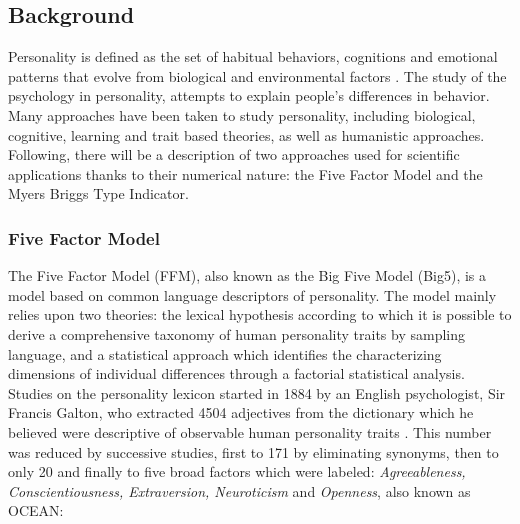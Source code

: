 \documentclass[b5paper,10pt,twoside,cucitura]{toptesi}
\begin{document}
\subsection{Background}

Personality is defined as the set of habitual behaviors, cognitions and emotional patterns that evolve from biological and environmental factors   \citep{gerald}. The study of the psychology in personality, attempts to explain people's differences in behavior. Many approaches have been taken to study personality, including biological, cognitive, learning and trait based theories, as well as humanistic approaches. Following, there will be a description of two approaches used for scientific applications thanks to their numerical nature: the Five Factor Model and the Myers Briggs Type Indicator.

\subsubsection{Five Factor Model}

The Five Factor Model (FFM), also known as the Big Five Model (Big5), is a model based on common language descriptors of personality. The model mainly relies upon two theories: the lexical hypothesis according to which it is possible to derive a comprehensive taxonomy of human personality traits by sampling language, and a statistical approach which identifies the characterizing dimensions of individual differences through a factorial statistical analysis.
Studies on the personality lexicon   \citep{lexicalapproach} started in 1884 by an English psychologist, Sir Francis Galton, who extracted 4504 adjectives from the dictionary which he believed were descriptive of observable human personality traits   \citep{galton}. This number was reduced by successive studies, first to 171 by eliminating synonyms, then to only 20 and finally to five broad factors which were labeled: \textit {Agreeableness, Conscientiousness, Extraversion, Neuroticism} and \textit{Openness}, also known as OCEAN:
\end{document}
